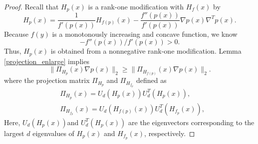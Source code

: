 \documentclass[aos,preprint]{imsart}
\theoremstyle{remark}
\begin{document}
\begin{appendix}
\begin{proof}\label{monotonously theorem proof}
Recall that $H_p(x)$ is a rank-one modification with $H_{f}(x)$ by 
\begin{equation}\label{rankone}
 H_{p}(x) =\frac{1}{ f'(p(x))} H_{f(p)}(x) - \frac{f''(p(x))}{ f'(p(x))} \nabla p(x) \nabla^T p(x) .
\end{equation}
 Because $f(y)$ is a monotonously increasing and concave function, we know 
\[
- f''(p(x))/f'(p(x))>0.
\] 
Thus, $H_{p}(x)$ is obtained from a nonnegative rank-one modification. Lemma \ref{projection_enlarge} implies
\begin{equation}\label{enlargement}
\|\Pi_{H_p}(x)\nabla p(x)\|_2 \geq \|\Pi_{H_{f(p)}}(x)\nabla p(x)\|_2.
\end{equation}
where the projection matrix $\Pi_{H_p}$ and $\Pi_{H_{f_p}} $ defined as
\[
\begin{aligned}
&\Pi_{H_p}(x)= U_d(H_p(x))U^T_d(H_p(x)), \\
&\Pi_{H_{f_p}}(x) = U_d(H_{f(p)}(x))U^T_d(H_{f_p}(x)),
\end{aligned}
\]
Here, $U_d(H_p(x))$and $U^T_d(H_p(x))$ are the eigenvectors corresponding to the largest $d$ eigenvalues of $H_p(x)$ and $H_{f_p}(x)$, respectively.


\end{proof}
\end{appendix}
\end{document}
